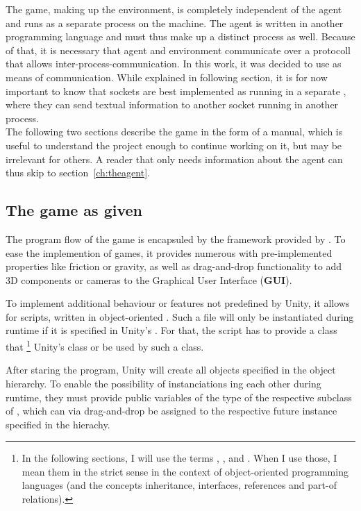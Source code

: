 \noindent The game, making up the environment, is completely independent of the agent and runs as a separate process on the machine. The agent is written in another programming language and must thus make up a distinct process as well. Because of that, it is necessary that agent and environment communicate over a protocoll that allows inter-process-communication. In this work, it was decided to use  as means of communication. While explained in following section, it is for now important to know that sockets are best implemented as running in a separate , where they can send textual information to another socket running in another process.\\

\noindent The following two sections describe the game in the form of a manual, which is useful to understand the project enough to continue working on it, but may be irrelevant for others. A reader that only needs information about the agent can thus skip to section~\ref{ch:theagent}.

\subsection{The game as given}
\label{ch:gamedescription}

The program flow of the game is encapsuled by the framework provided by . To ease the implemention of games, it provides numerous  with pre-implemented properties like friction or gravity, as well as drag-and-drop functionality to add 3D components or cameras to the Graphical User Interface (\textbf{GUI}).

To implement additional behaviour or features not predefined by Unity, it allows for scripts, written in object-oriented . Such a file will only be instantiated during runtime if it is specified in Unity's . For that, the script has to provide a class that \footnote{In the following sections, I will use the terms , ,  and . When I use those, I mean them in the strict sense in the context of object-oriented programming languages (and the concepts inheritance, interfaces, references and part-of relations).} Unity's class  or be used by such a class.

After staring the program, Unity will create all objects specified in the object hierarchy. To enable the possibility of instanciations ing each other during runtime, they must provide public variables of the type of the respective subclass of , which can via drag-and-drop be assigned to the respective future instance specified in the hierachy. 

